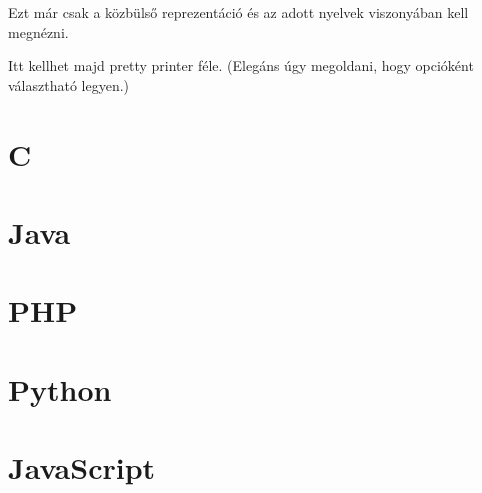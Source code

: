 
Ezt már csak a közbülső reprezentáció és az adott nyelvek viszonyában kell megnézni.

Itt kellhet majd pretty printer féle. (Elegáns úgy megoldani, hogy opcióként választható legyen.)


\section{C}

\section{Java}

\section{PHP}

\section{Python}

\section{JavaScript}

